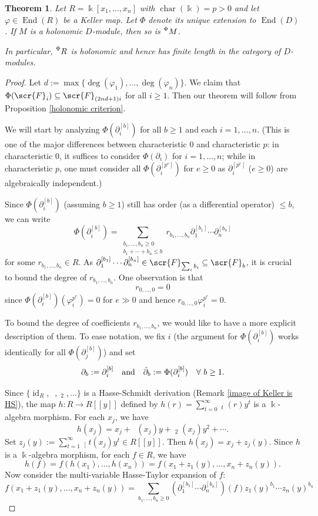 \documentclass[11pt]{amsart}
\newtheorem{theorem}{Theorem}[section]
\theoremstyle{definition}
\theoremstyle{remark}
\numberwithin{equation}{subsection}
\DeclareMathOperator{\id}{id}
\DeclareMathOperator{\kk}{\Bbbk}
\DeclareMathOperator{\tp}{\tilde{\partial}}
\DeclareMathOperator{\ch}{char}
\DeclareMathOperator{\End}{End}
\begin{document}
\begin{theorem}
\label{thm: psi preserve holonomic}
Let $R=\kk[x_1,\dots,x_n]$ with $\ch(\kk)=p>0$ and let $\varphi\in \End(R)$ be a Keller map. Let $\Phi$ denote its unique extension to $\End(D)$. If $M$ is a holonomic $D$-module, then so is $\prescript{\Phi}{}M$.

In particular, $\prescript{\Phi}{}R$ is holonomic and hence has finite length in the category of $D$-modules.
\end{theorem}
\begin{proof}
Let $d:=\max\{\deg(\varphi_1),\dots,\deg(\varphi_n)\}$. We claim that $\Phi(\scr{F}_i)\subseteq \scr{F}_{(2nd+1)i}$ for all $i\geq 1$. Then our theorem will follow from Proposition \ref{holonomic criterion}.

We will start by analyzing $\Phi(\partial^{[b]}_i)$ for all $b\geq 1$ and each $i=1,\dots,n$. (This is one of the major differences between characteristic 0 and characteristic $p$: in characteristic 0, it suffices to consider $\Phi(\partial_i)$ for $i=1,\dots,n$; while in characteristic $p$, one must consider all $\Phi(\partial^{[p^e]}_i)$ for $e\geq 0$ as $\partial^{[p^e]}_i$ ($e\geq 0$) are algebraically independent.) 

Since $\Phi(\partial_i^{[b]})$ (assuming $b\geq 1$) still has order (as a differential operator) $\leq b$, we can write
\begin{equation}
\label{equ: coefficients r}
\Phi(\partial_i^{[b]})=\sum_{\substack{b_1,\dots,b_n\geq 0\\ b_1+\cdots+b_n\leq b}} r_{b_1,\dots,b_n}\partial^{[b_1]}_1\cdots \partial^{[b_n]}_n
\end{equation}
for some $r_{b_1,\dots,b_n}\in R$. As $\partial^{[b_1]}_1\cdots \partial^{[b_n]}_n\in \scr{F}_{\sum_ib_i}\subseteq \scr{F}_b$, it is crucial to bound the degree of $r_{b_1,\dots,b_n}$. One observation is that 
\[r_{0,\dots,0}=0\] 
since $\Phi(\partial^{[b]}_i)(\varphi^{p^e}_i)=0$ for $e\gg 0$ and hence $r_{0,\dots,0}\varphi^{p^e}_i=0$.

To bound the degree of coefficients $r_{b_1,\dots,b_n}$, we would like to have a more explicit description of them. To ease notation, we fix $i$ (the argument for $\Phi(\partial^{[b]}_i)$ works identically for all $\Phi(\partial^{[b]}_j)$) and set
\[\partial_b:=\partial^{[b]}_i\quad {\rm and}\quad \tilde{\partial}_{b}:=\Phi(\partial^{[b]}_i)\quad \forall\ b\geq 1.\]

Since $\{\id_R, \tp,\tp_{2},\dots\}$ is a Hasse-Schmidt derivation (Remark \ref{image of Keller is HS}), the map $h:R\to R[[y]]$ defined by $h(r)=\sum_{t=0}^{\infty}\tp_{t}(r)y^t$ is a $\kk$-algebra morphism. For each $x_j$, we have 
\[h(x_j)=x_j+\tp(x_j)y+\tp_{2}(x_j)y^2+\cdots.\]
Set $z_j(y):=\sum_{t=1}^{\infty}\tp_[{t}(x_j)y^t\in R[[y]]$. Then $h(x_j)=x_j+z_j(y)$. Since $h$ is a $\kk$-algebra morphism, for each $f\in R$, we have
\[h(f)=f(h(x_1),\dots,h(x_n))=f(x_1+z_1(y),\dots,x_n+z_n(y)).\]
Now consider the multi-variable Hasse-Taylor expansion of $f$: 
\[f(x_1+z_1(y),\dots,x_n+z_n(y))=\sum_{b_1,\dots,b_n\geq 0} (\partial^{[b_1]}_1\cdots \partial^{[b_n]}_n)(f)z_1(y)^{b_1}\cdots z_n(y)^{b_n}\]


\end{proof}
\end{document}

